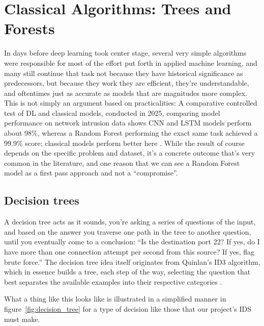 \section{Classical Algorithms: Trees and Forests}
\label{sec:classical_ml}

In days before deep learning took center stage, several very simple algorithms were responsible for most of the effort put forth in applied machine learning, and many still continue that task not because they have historical significance as predecessors, but because they work they are efficient, they’re understandable, and oftentimes just as accurate as models that are magnitudes more complex. This is not simply an argument based on practicalities: A comparative controlled test of DL and classical models, conducted in 2025, comparing model performance on network intrusion data shows CNN and LSTM models perform about 98\%, whereas a Random Forest performing the exact same task achieved a 99.9\% score; classical models perform better here \cite{ali2025dlvsml}. While the result of course depends on the specific problem and dataset, it’s a concrete outcome that’s very common in the literature, and one reason that we can see a Random Forest model as a first pass approach and not a “compromise”.
 
\subsection{Decision trees}
 
A decision tree acts as it sounds, you’re asking a series of questions of the input, and based on the answer you traverse one path in the tree to another question, until you eventually come to a conclusion: “Is the destination port 22? If yes, do I have more than one connection attempt per second from this source? If yes, flag brute force.” The decision tree idea itself originates from Quinlan’s ID3 algorithm, which in essence builds a tree, each step of the way, selecting the question that best separates the available examples into their respective categories \cite{quinlan1986id3}.
 
What a thing like this looks like is illustrated in a simplified manner in figure~\ref{fig:decision_tree} for a type of decision like those that our project’s IDS must make.
 
